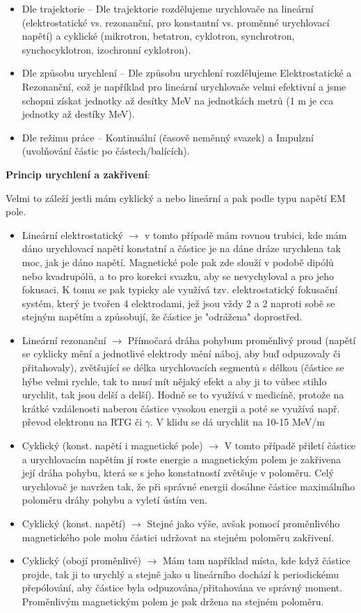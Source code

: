 \begin{itemize}
    \item Dle trajektorie -- Dle trajektorie rozdělujeme urychlovače na lineární (elektrostatické vs. rezonanční, pro konstantní vs. proměnné urychlovací napětí) a cyklické (mikrotron, betatron, cyklotron, synchrotron, synchocyklotron, izochronní cyklotron).
    \item Dle způsobu urychlení -- Dle způsobu urychlení rozdělujeme Elektrostatické a Rezonanční, což je například pro lineární urychlovače velmi efektivní a jsme schopni získat jednotky až desítky MeV na jednotkách metrů (1 m je cca jednotky až destíky MeV).
    \item Dle režimu práce -- Kontinuální (časově neměnný svazek) a Impulzní (uvolňování částic po částech/balících).
\end{itemize}

\textbf{Princip urychlení a zakřivení}:

Velmi to záleží jestli mám cyklický a nebo lineární a pak podle typu napětí EM pole.

\begin{itemize}
    \item Lineární elektrostatický $\rightarrow$ v tomto případě mám rovnou trubici, kde mám dáno urychlovací napětí konstatní a částice je na dáne dráze urychlena tak moc, jak je dáno napětí. Magnetické pole pak zde slouží v podobě dipólů nebo kvadrupólů, a to pro korekci svazku, aby se nevychyloval a pro jeho fokusaci. K tomu se pak typicky ale využívá tzv. elektrostatický fokusační systém, který je tvořen 4 elektrodami, jež jsou vždy 2 a 2 naproti sobě se stejným napětím a způsobují, že částice je "odrážena" doprostřed.
    \item Lineární rezonanční $\rightarrow$ Přímočará dráha pohybum proměnlivý proud (napětí se cyklicky mění a jednotlivé elektrody mění náboj, aby buď odpuzovaly či přitahovaly), zvětšující se délka urychlovacích segmentů s délkou (částice se hýbe velmi rychle, tak to musí mít nějaký efekt a aby ji to vůbec stihlo urychlit, tak jsou delší a delší). Hodně se to využívá v medicíně, protože na krátké vzdálenosti naberou částice vysokou energii a poté se využívá např. převod elektronu na RTG či $\gamma$. V klidu se dá urychlit na 10-15 MeV/m
    \item Cyklický (konst. napětí i magnetické pole) $\rightarrow$ V tomto případě přiletí částice a urychlovacím napětím jí roste energie a magnetickým polem je zakřivena její dráha pohybu, která se s jeho konstatností zvětšuje v poloměru. Celý urychlovač je navržen tak, že při správné energii dosáhne částice maximálního poloměru dráhy pohybu a vyletí ústím ven.
    \item Cyklický (konst. napětí) $\rightarrow$ Stejné jako výše, avšak pomocí proměnlivého magnetického pole mohu částici udržovat na stejném poloměru zakřivení.
    \item Cyklický (obojí proměnlivé) $\rightarrow$ Mám tam například místa, kde když částice projde, tak ji to urychlý a stejně jako u lineárního dochází k periodickému přepólování, aby částice byla odpuzována/přitahována ve správný moment. Proměnlivým magnetickým polem je pak držena na stejném poloměru.
\end{itemize}

